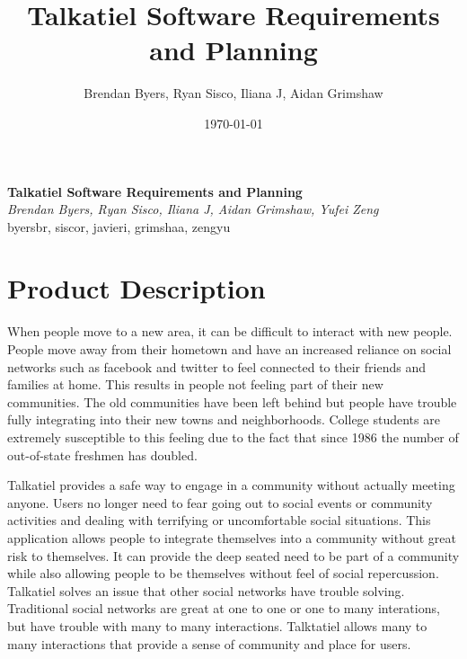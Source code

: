 \documentclass[12pt]{article}
\title{Talkatiel Software Requirements and Planning}
\author{Brendan Byers, Ryan Sisco, Iliana J, Aidan Grimshaw}
\date{\today}
\begin{document}
\begin{center}
      \Large\textbf{Talkatiel Software Requirements and Planning}\\
      \large\textit{Brendan Byers, Ryan Sisco, Iliana J, Aidan Grimshaw, Yufei Zeng}\\
      \large{byersbr, siscor, javieri, grimshaa, zengyu}\\
   \end{center}

\tableofcontents

\section{Product Description}
  When people move to a new area, it can be difficult to interact with new people.  People move away from their hometown and have an increased reliance on social networks such as facebook and twitter to feel connected to their friends and families at home.  This results in people not feeling part of their new communities.  The old communities have been left behind but people have trouble fully integrating into their new towns and neighborhoods.  College students are extremely susceptible to this feeling due to the fact that since 1986 the number of out-of-state freshmen has doubled\cite{item2}.

  Talkatiel provides a safe way to engage in a community without actually meeting anyone.  Users no longer need to fear going out to social events or community activities and dealing with terrifying or uncomfortable social situations.  This application allows people to integrate themselves into a community without great risk to themselves.  It can provide the deep seated need to be part of a community while also allowing people to be themselves without feel of social repercussion.  Talkatiel solves an issue that other social networks have trouble solving.  Traditional social networks are great at one to one or one to many interations, but have trouble with many to many interactions.  Talktatiel allows many to many interactions that provide a sense of community and place for users.
\end{document}
